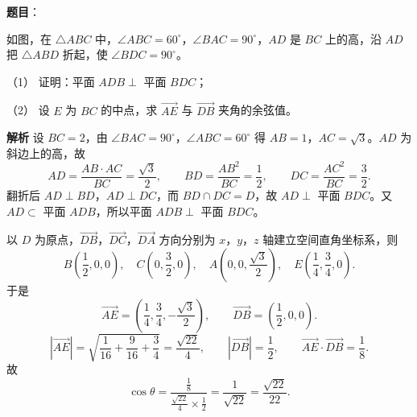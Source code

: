 \begin{answer}

\textbf{题目}：

如图，在 $\triangle ABC$ 中，$\angle ABC=60^\circ$，$\angle BAC=90^\circ$，$AD$ 是 $BC$ 上的高，沿 $AD$ 把 $\triangle ABD$ 折起，使 $\angle BDC=90^\circ$。

（1） 证明：平面 $ADB\perp$ 平面 $BDC$；

（2） 设 $E$ 为 $BC$ 的中点，求 $\overrightarrow{AE}$ 与 $\overrightarrow{DB}$ 夹角的余弦值。
\nopagebreak[4]
\begin{center}\end{center}
\nopagebreak[4]
\textbf{解析}
设 $BC=2$，由 $\angle BAC=90^\circ$，$\angle ABC=60^\circ$ 得 $AB=1$，$AC=\sqrt3$。$AD$ 为斜边上的高，故
\nopagebreak[4]
\[AD=\frac{AB\cdot AC}{BC}=\frac{\sqrt3}2,\qquad BD=\frac{AB^2}{BC}=\frac12,\qquad DC=\frac{AC^2}{BC}=\frac32.\]
翻折后 $AD\perp BD$，$AD\perp DC$，而 $BD\cap DC=D$，故 $AD\perp$ 平面 $BDC$。又 $AD\subset$ 平面 $ADB$，所以平面 $ADB\perp$ 平面 $BDC$。

以 $D$ 为原点，$\overrightarrow{DB}$，$\overrightarrow{DC}$，$\overrightarrow{DA}$ 方向分别为 $x$，$y$，$z$ 轴建立空间直角坐标系，则
\nopagebreak[4]
\[B\left(\frac12,0,0\right),\quad C\left(0,\frac32,0\right),\quad A\left(0,0,\frac{\sqrt3}2\right),\quad E\left(\frac14,\frac34,0\right).\]
于是
\nopagebreak[4]
\[\overrightarrow{AE}=\left(\frac14,\frac34,-\frac{\sqrt3}2\right),\qquad \overrightarrow{DB}=\left(\frac12,0,0\right).\]
\nopagebreak[4]
\[|\overrightarrow{AE}|=\sqrt{\frac1{16}+\frac9{16}+\frac34}=\frac{\sqrt{22}}4,\qquad |\overrightarrow{DB}|=\frac12,\qquad \overrightarrow{AE}\cdot\overrightarrow{DB}=\frac18.\]
故
\nopagebreak[4]
\[\cos\theta=\frac{\frac18}{\frac{\sqrt{22}}4\times\frac12}=\frac1{\sqrt{22}}=\frac{\sqrt{22}}{22}.\]



\end{answer}
